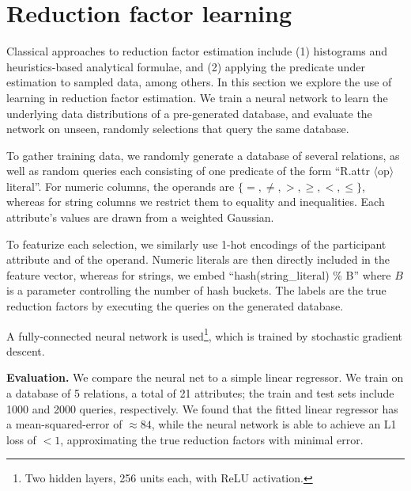 \section{Reduction factor learning}

Classical approaches to reduction factor estimation include (1) histograms and
heuristics-based analytical formulae, and (2) applying the predicate under
estimation to sampled data, among others.  In this section we explore the use of
learning in reduction factor estimation.  We train a neural network to learn the
underlying data distributions of a pre-generated database, and evaluate the
network on unseen, randomly selections that query the same database.

To gather training data, we randomly generate a database of several relations,
as well as random queries each consisting of one predicate of the form ``R.attr
$\langle$op$\rangle$ literal''.  For numeric columns, the operands are $\{=,
\neq, >, \geq, <, \leq\}$, whereas for string columns we restrict them to
equality and inequalities.  Each attribute's values are drawn from a weighted
Gaussian.

To featurize each selection, we similarly use 1-hot encodings of the participant
attribute and of the operand.  Numeric literals are then directly included in
the feature vector, whereas for strings, we embed ``hash(string\_literal) \% B''
where $B$ is a parameter controlling the number of hash buckets.  The labels are
the true reduction factors by executing the queries on the generated database.

A fully-connected neural network is used\footnote{Two hidden layers, 256 units
each, with ReLU activation.}, which is trained by stochastic gradient descent.

{\bf Evaluation.}  We compare the neural net to a simple linear regressor.  We
train on a database of 5 relations, a total of 21 attributes; the train and test
sets include 1000 and 2000 queries, respectively. We found that the fitted
linear regressor has a mean-squared-error of $\approx 84$, while the neural
network is able to achieve an L1 loss of $< 1$, approximating the true reduction
factors with minimal error.  
